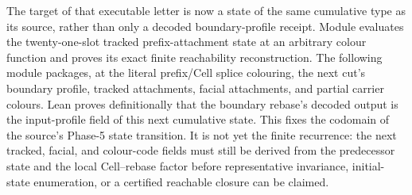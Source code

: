 \documentclass[11pt]{article}
\theoremstyle{definition}
\begin{document}
The target of that executable letter is now a state of the same cumulative
type as its source, rather than only a decoded boundary-profile receipt.
Module
evaluates the twenty-one-slot tracked prefix-attachment state at an arbitrary
colour function and proves its exact finite reachability reconstruction.  The
following module
packages, at the literal prefix/Cell splice colouring, the next cut's boundary
profile, tracked attachments, facial attachments, and partial carrier colours.
Lean proves definitionally that the boundary rebase's decoded output is the
input-profile field of this next cumulative state.  This fixes the codomain of
the source's Phase-5 state transition.  It is not yet the finite recurrence:
the next tracked, facial, and colour-code fields must still be derived from the
predecessor state and the local Cell--rebase factor before representative
invariance, initial-state enumeration, or a certified reachable closure can be
claimed.
\end{document}
